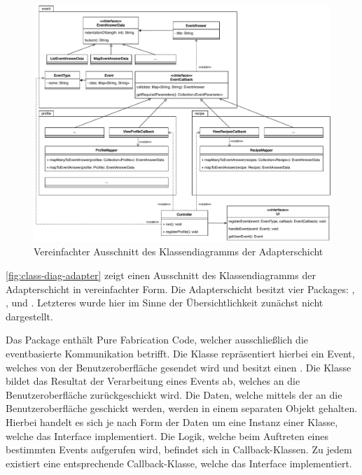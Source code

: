 \begin{figure}[ht!]
    \includegraphics[width=0.98\columnwidth]{../diagrams/adapter_uml.pdf}
    \caption{Vereinfachter Ausschnitt des Klassendiagramms der Adapterschicht}
    \label{fig:class-diag-adapter}
\end{figure}

\autoref{fig:class-diag-adapter} zeigt einen Ausschnitt des Klassendiagramms der Adapterschicht in vereinfachter Form. Die Adapterschicht besitzt vier Packages: , ,  und . Letzteres wurde hier im Sinne der Übersichtlichkeit zunächst nicht dargestellt. 

Das Package  enthält Pure Fabrication Code, welcher ausschließlich die eventbasierte Kommunikation betrifft. Die Klasse  repräsentiert hierbei ein Event, welches von der Benutzeroberfläche gesendet wird und besitzt einen . Die Klasse  bildet das Resultat der Verarbeitung eines Events ab, welches an die Benutzeroberfläche zurückgeschickt wird. Die Daten, welche mittels der  an die Benutzeroberfläche geschickt werden, werden in einem separaten Objekt gehalten. Hierbei handelt es sich je nach Form der Daten um eine Instanz einer Klasse, welche das Interface  implementiert. Die Logik, welche beim Auftreten eines bestimmten Events aufgerufen wird, befindet sich in Callback-Klassen. Zu jedem  existiert eine entsprechende Callback-Klasse, welche das Interface  implementiert.

